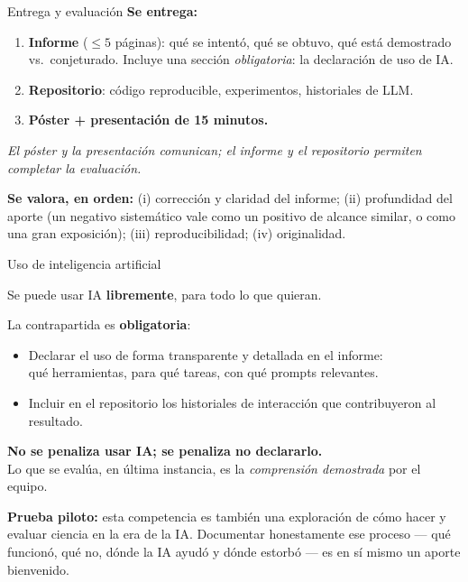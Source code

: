\documentclass[10pt,aspectratio=169]{beamer}
\begin{document}
\begin{frame}{Entrega y evaluación}
\textbf{Se entrega:}
\begin{enumerate}
    \item \textbf{Informe} ($\le 5$ páginas): qué se intentó, qué se obtuvo, qué está demostrado vs.\ conjeturado. Incluye una sección \emph{obligatoria}: la declaración de uso de IA.
    \item \textbf{Repositorio}: código reproducible, experimentos, historiales de LLM.
    \item \textbf{Póster + presentación de 15 minutos.}
\end{enumerate}
\emph{El póster y la presentación comunican; el informe y el repositorio permiten completar la evaluación.}
\pause
\medskip

\textbf{Se valora, en orden:} (i) corrección y claridad del informe; (ii) profundidad del aporte (un negativo sistemático vale como un positivo de alcance similar, o como una gran exposición); (iii) reproducibilidad; (iv) originalidad.
\end{frame}

\begin{frame}{Uso de inteligencia artificial}
\begin{center}
\Large Se puede usar IA \textbf{libremente}, para todo lo que quieran.
\end{center}
\medskip
\pause
La contrapartida es \textbf{obligatoria}:
\begin{itemize}
    \item Declarar el uso de forma transparente y detallada en el informe:\\ qué herramientas, para qué tareas, con qué prompts relevantes.
    \item Incluir en el repositorio los historiales de interacción que contribuyeron al resultado.
\end{itemize}
\medskip
\textbf{No se penaliza usar IA; se penaliza no declararlo.}\\
Lo que se evalúa, en última instancia, es la \emph{comprensión demostrada} por el equipo.
\pause
\medskip

\textbf{Prueba piloto:} esta competencia es también una exploración de cómo hacer y evaluar ciencia en la era de la IA. Documentar honestamente ese proceso --- qué funcionó, qué no, dónde la IA ayudó y dónde estorbó --- es en sí mismo un aporte bienvenido.
\end{frame}
\end{document}
